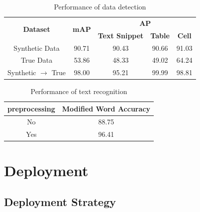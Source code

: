 \documentclass[sigconf]{acmart}
\begin{document}

\begin{table}
	\caption{Performance of data detection}
	\label{tabel_detection}
	\centering
	\begin{tabular}{ccccc}
		\toprule
		\multirow{2}{1cm}{\textbf{Dataset}} & \multirow{2}{0.8cm}{\textbf{mAP}} & \multicolumn{3}{c}{\textbf{AP}}\\
		\cline{3-5}
		& & \textbf{Text Snippet} & \textbf{Table} & \textbf{Cell}\\
		\midrule
		Synthetic Data & 90.71 & 90.43 & 90.66 & 91.03 \\
		True Data & 53.86 & 48.33 & 49.02 & 64.24 \\
		Synthetic $\rightarrow$ True & 98.00 & 95.21 & 99.99 & 98.81 \\
		\bottomrule
	\end{tabular}
\end{table}

\begin{table}
	\caption{Performance of text recognition}
	\label{text_recognition}
	\centering
	\begin{tabular}{cc}
	\toprule
	\textbf{preprocessing} & \textbf{Modified Word Accuracy} \\
	\midrule
	No & 88.75 \\
	Yes & 96.41 \\
	\bottomrule
	\end{tabular}
\end{table}


\section{Deployment}
\subsection{Deployment Strategy}
\end{document}
